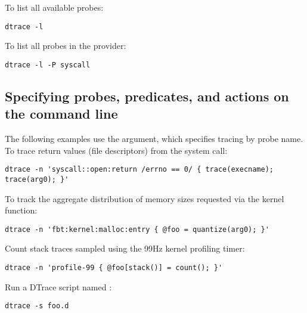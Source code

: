 \documentclass[a4paper,10pt]{article}
\begin{document}
To list all available probes:

\begin{small}
\begin{verbatim}
dtrace -l
\end{verbatim}
\end{small}

\noindent
To list all probes in the  provider:

\begin{small}
\begin{verbatim}
dtrace -l -P syscall
\end{verbatim}
\end{small}

\subsection*{Specifying probes, predicates, and actions on the command line}

The following examples use the  argument, which specifies tracing by
probe name.
To trace return values (file descriptors) from the  system call:

\begin{small}
\begin{verbatim}
dtrace -n 'syscall::open:return /errno == 0/ { trace(execname); trace(arg0); }'
\end{verbatim}
\end{small}

\noindent
To track the aggregate distribution of memory sizes requested via the kernel
 function:

\begin{small}
\begin{verbatim}
dtrace -n 'fbt:kernel:malloc:entry { @foo = quantize(arg0); }'
\end{verbatim}
\end{small}

\noindent
Count stack traces sampled using the 99Hz kernel profiling timer:

\begin{small}
\begin{verbatim}
dtrace -n 'profile-99 { @foo[stack()] = count(); }'
\end{verbatim}
\end{small}

\noindent
Run a DTrace script named :

\begin{small}
\begin{verbatim}
dtrace -s foo.d
\end{verbatim}
\end{small}
\end{document}
